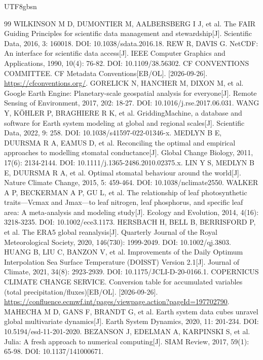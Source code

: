 \documentclass[numdoi]{chinese}
\begin{document}
\begin{CJK}{UTF8}{gbsn}
\begingroup\singlespacing\begin{thebibliography}{99}\small\setlength{\itemsep}{5pt}
WILKINSON M D, DUMONTIER M, AALBERSBERG I J, et al. The FAIR Guiding Principles for scientific data management and stewardship[J]. Scientific Data, 2016, 3: 160018. DOI: 10.1038/sdata.2016.18.
REW R, DAVIS G. NetCDF: An interface for scientific data access[J]. IEEE Computer Graphics and Applications, 1990, 10(4): 76-82. DOI: 10.1109/38.56302.
CF CONVENTIONS COMMITTEE. CF Metadata Conventions[EB/OL]. [2026-09-26]. \url{https://cfconventions.org/}.
GORELICK N, HANCHER M, DIXON M, et al. Google Earth Engine: Planetary-scale geospatial analysis for everyone[J]. Remote Sensing of Environment, 2017, 202: 18-27. DOI: 10.1016/j.rse.2017.06.031.
WANG Y, KÖHLER P, BRAGHIERE R K, et al. GriddingMachine, a database and software for Earth system modeling at global and regional scales[J]. Scientific Data, 2022, 9: 258. DOI: 10.1038/s41597-022-01346-x.
MEDLYN B E, DUURSMA R A, EAMUS D, et al. Reconciling the optimal and empirical approaches to modelling stomatal conductance[J]. Global Change Biology, 2011, 17(6): 2134-2144. DOI: 10.1111/j.1365-2486.2010.02375.x.
LIN Y S, MEDLYN B E, DUURSMA R A, et al. Optimal stomatal behaviour around the world[J]. Nature Climate Change, 2015, 5: 459-464. DOI: 10.1038/nclimate2550.
WALKER A P, BECKERMAN A P, GU L, et al. The relationship of leaf photosynthetic traits—Vcmax and Jmax—to leaf nitrogen, leaf phosphorus, and specific leaf area: A meta-analysis and modeling study[J]. Ecology and Evolution, 2014, 4(16): 3218-3235. DOI: 10.1002/ece3.1173.
HERSBACH H, BELL B, BERRISFORD P, et al. The ERA5 global reanalysis[J]. Quarterly Journal of the Royal Meteorological Society, 2020, 146(730): 1999-2049. DOI: 10.1002/qj.3803.
HUANG B, LIU C, BANZON V, et al. Improvements of the Daily Optimum Interpolation Sea Surface Temperature (DOISST) Version 2.1[J]. Journal of Climate, 2021, 34(8): 2923-2939. DOI: 10.1175/JCLI-D-20-0166.1.
COPERNICUS CLIMATE CHANGE SERVICE. Conversion table for accumulated variables (total precipitation/fluxes)[EB/OL]. [2026-09-26]. \url{https://confluence.ecmwf.int/pages/viewpage.action?pageId=197702790}.
MAHECHA M D, GANS F, BRANDT G, et al. Earth system data cubes unravel global multivariate dynamics[J]. Earth System Dynamics, 2020, 11: 201-234. DOI: 10.5194/esd-11-201-2020.
BEZANSON J, EDELMAN A, KARPINSKI S, et al. Julia: A fresh approach to numerical computing[J]. SIAM Review, 2017, 59(1): 65-98. DOI: 10.1137/141000671.

\end{thebibliography}
\end{CJK}
\end{document}

